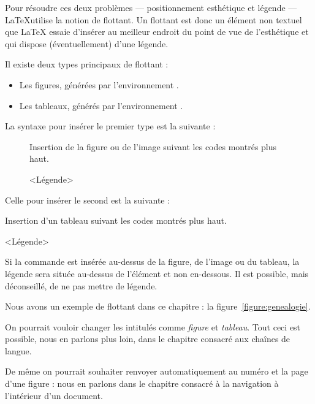 Pour résoudre ces deux problèmes --- positionnement esthétique et légende --- \LaTeX utilise la notion de flottant. Un flottant est donc un élément non textuel que LaTeX essaie d'insérer au meilleur endroit du point de vue de l'esthétique et qui dispose (éventuellement) d'une légende.

Il existe deux types principaux de flottant :
\begin{itemize}
    \item Les figures, générées par l'environnement .
    \item Les tableaux, générés par l'environnement .
\end{itemize}

La syntaxe pour insérer le premier type est la suivante :

\begin{latexcode}
\begin{figure}[<paramètre de placement>]
    Insertion de la figure ou de l'image suivant les codes montrés plus haut.
    \caption{<Légende>}
\end{figure} 
\end{latexcode}

Celle pour insérer le second est la suivante :

\begin{latexcode}
\begin{table}[<paramètre de placement>]
    Insertion d'un tableau suivant les codes montrés plus haut.
    \caption{<Légende>}
\end{table} 
\end{latexcode}

Si la commande  est insérée au-dessus de la figure, de l'image ou du tableau, la légende sera située au-dessus de l'élément et non en-dessous. Il est possible, mais déconseillé, de ne pas mettre de légende.

Nous avons un exemple de flottant   dans ce chapitre : la figure~\ref{figure:genealogie}.
\begin{attention}
    On pourrait vouloir changer les intitulés comme \emph{figure} et \emph{tableau}. Tout ceci est possible, nous en parlons plus loin, dans le chapitre consacré aux chaînes de langue.
    
    De même on pourrait souhaiter renvoyer automatiquement au numéro et la page d'une figure : nous en parlons dans le chapitre consacré à la navigation à l'intérieur d'un document.
\end{attention}

